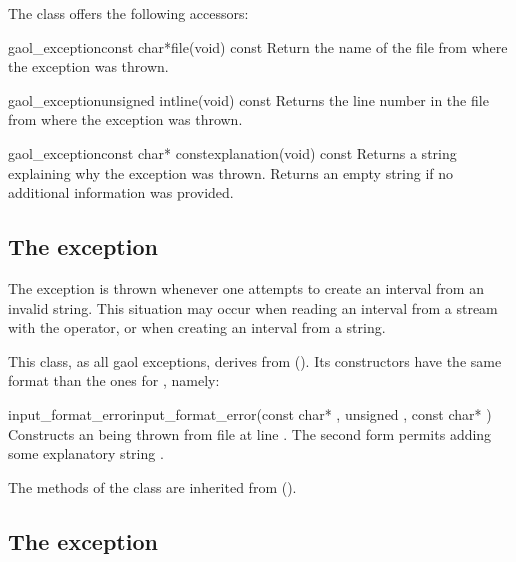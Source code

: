 \documentclass{manual}
\begin{document}
\noindent
The class offers the following accessors:

\begin{defmethod}{gaol\_exception}{const char*}{file}{(void) const}
  Return the name of the file from where the exception was thrown.
\end{defmethod}

\begin{defmethod}{gaol\_exception}{unsigned int}{line}{(void) const}
  Returns the line number in the file from where the exception was thrown.
\end{defmethod}

\begin{defmethod}{gaol\_exception}{const char* const}{explanation}{(void) const}
  Returns a string explaining why the exception was thrown. Returns an empty
  string if no additional information was provided.
\end{defmethod}

\subsection{The  exception}
The  exception is thrown whenever one attempts to
create an interval from an invalid string. This situation may occur when
reading an interval from a stream with the \code{>{}>} operator, or when
creating an interval from a string.

This class, as all gaol exceptions, derives from 
(). Its constructors have the same format
than the ones for , namely:

\begin{defmethod}{input\_format\_error}{}{input\_format\_error}{(const char* , unsigned , const char* )}
Constructs an  being thrown from file  at
line . The second form permits adding some explanatory string .
\end{defmethod}
The methods of the class are inherited from 
().

\subsection{The  exception}
\end{document}
